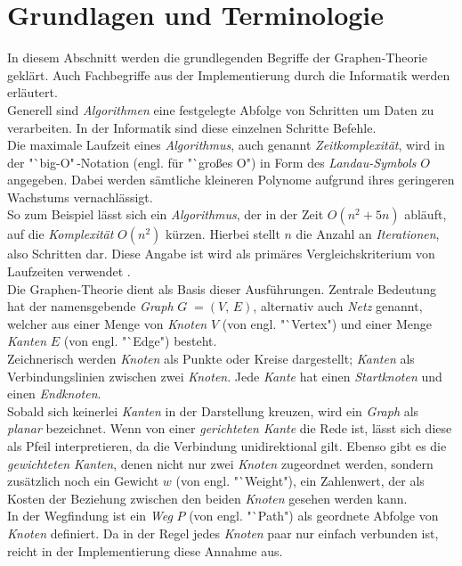 \documentclass[12pt]{article}
\begin{document}
\section{Grundlagen und Terminologie}
\label{sec:basics}
In diesem Abschnitt werden die grundlegenden Begriffe der Graphen-Theorie geklärt. Auch Fachbegriffe aus der Implementierung durch die Informatik werden erläutert.
\\
Generell sind \textit{Algorithmen} eine festgelegte Abfolge von Schritten um Daten zu verarbeiten. In der Informatik sind diese einzelnen Schritte Befehle.
\\
Die maximale Laufzeit eines \textit{Algorithmus}, auch genannt \textit{Zeitkomplexität}, wird in der "`big-O"\,-Notation (engl. für "`großes O") in Form des \textit{Landau-Symbols} $O$ angegeben. Dabei werden sämtliche kleineren Polynome aufgrund ihres geringeren Wachstums vernachlässigt. 
\\
So zum Beispiel lässt sich ein \textit{Algorithmus}, der in der Zeit $O(n^2+5n)$ abläuft, auf die \textit{Komplexität} $O(n^2)$ kürzen. Hierbei stellt $n$ die Anzahl an \textit{Iterationen}, also Schritten dar. Diese Angabe ist wird als primäres Vergleichskriterium von Laufzeiten verwendet \cite{big-o}.
\\
Die Graphen-Theorie dient als Basis dieser Ausführungen. Zentrale Bedeutung hat der namensgebende \textit{Graph} $G\; = (V,\,E)$, alternativ auch \textit{Netz} genannt, welcher aus einer Menge von \textit{Knoten} $V$ (von engl. "`Vertex") und einer Menge \textit{Kanten} $E$ (von engl. "`Edge") besteht.
\\
Zeichnerisch werden \textit{Knoten} als Punkte oder Kreise dargestellt; \textit{Kanten} als Verbindungslinien zwischen zwei \textit{Knoten}. Jede \textit{Kante} hat einen \textit{Startknoten} und einen \textit{Endknoten}. 
\\
Sobald sich keinerlei \textit{Kanten} in der Darstellung kreuzen, wird ein \textit{Graph} als \textit{planar} bezeichnet. Wenn von einer \textit{gerichteten Kante} die Rede ist, lässt sich diese als Pfeil interpretieren, da die Verbindung unidirektional gilt. Ebenso gibt es die \textit{gewichteten Kanten}, denen nicht nur zwei \textit{Knoten} zugeordnet werden, sondern zusätzlich noch ein Gewicht $w$ (von engl. "`Weight"), ein Zahlenwert, der als Kosten der Beziehung zwischen den beiden \textit{Knoten} gesehen werden kann.
\\
In der Wegfindung ist ein \textit{Weg} $P$ (von engl. "`Path") als geordnete Abfolge von \textit{Knoten} definiert. Da in der Regel jedes \textit{Knoten} paar nur einfach verbunden ist, reicht in der Implementierung diese Annahme aus.
\end{document}
